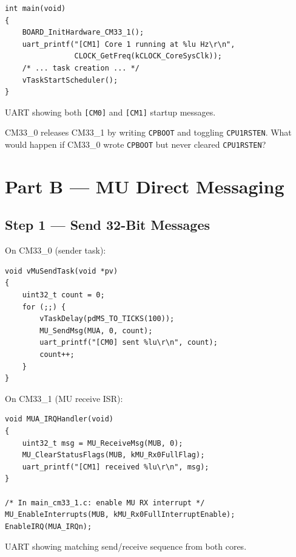\documentclass[11pt, a4paper]{article}
\begin{document}
\begin{lstlisting}[style=cstyle]
int main(void)
{
    BOARD_InitHardware_CM33_1();
    uart_printf("[CM1] Core 1 running at %lu Hz\r\n",
                CLOCK_GetFreq(kCLOCK_CoreSysClk));
    /* ... task creation ... */
    vTaskStartScheduler();
}
\end{lstlisting}

\begin{checkpointbox}[~A]
  UART showing both \texttt{[CM0]} and \texttt{[CM1]} startup messages.
\end{checkpointbox}

\begin{questionbox}[~A1]
  CM33\_0 releases CM33\_1 by writing \texttt{CPBOOT} and toggling
  \texttt{CPU1RSTEN}. What would happen if CM33\_0 wrote \texttt{CPBOOT} but never
  cleared \texttt{CPU1RSTEN}?
\end{questionbox}

\section{Part B --- MU Direct Messaging}

\subsection{Step 1 --- Send 32-Bit Messages}

On CM33\_0 (sender task):

\begin{lstlisting}[style=cstyle]
void vMuSendTask(void *pv)
{
    uint32_t count = 0;
    for (;;) {
        vTaskDelay(pdMS_TO_TICKS(100));
        MU_SendMsg(MUA, 0, count);
        uart_printf("[CM0] sent %lu\r\n", count);
        count++;
    }
}
\end{lstlisting}

On CM33\_1 (MU receive ISR):

\begin{lstlisting}[style=cstyle]
void MUA_IRQHandler(void)
{
    uint32_t msg = MU_ReceiveMsg(MUB, 0);
    MU_ClearStatusFlags(MUB, kMU_Rx0FullFlag);
    uart_printf("[CM1] received %lu\r\n", msg);
}

/* In main_cm33_1.c: enable MU RX interrupt */
MU_EnableInterrupts(MUB, kMU_Rx0FullInterruptEnable);
EnableIRQ(MUA_IRQn);
\end{lstlisting}

\begin{checkpointbox}[~B]
  UART showing matching send/receive sequence from both cores.
\end{checkpointbox}
\end{document}
